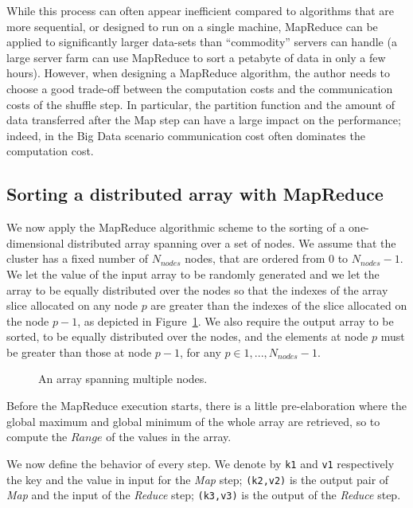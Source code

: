 \documentclass[a4paper]{article}
\numberwithin{equation}{section}
\begin{document}
While this process can often appear
inefficient compared to algorithms that are more sequential, or
designed to run on a single machine, MapReduce can be applied to
significantly larger data-sets than ``commodity'' servers can handle (a
large server farm can use MapReduce to sort a petabyte of data in only
a few hours\cite{petasort}). 
However,
 when designing a MapReduce algorithm, the author needs to choose a
good trade-off\cite{Ullman:2012:DGM:2331042.2331053} between the
computation costs and the communication costs of the shuffle
step. In particular, the partition function and the amount of data
transferred after the Map step can have a large impact on the
performance; indeed, in the Big Data scenario communication cost often
dominates the computation cost. 


\subsection{Sorting a distributed array with MapReduce}

We now apply the MapReduce algorithmic scheme to the sorting of
a one-dimensional distributed array spanning over a set of nodes. 
We assume that the cluster has a fixed number of $N_{\mathit{nodes}}$ nodes, that are
ordered from $0$ to $N_{\mathit{nodes}}-1$. We let the value of the input array to be randomly generated 
and we let the array to be equally distributed over the nodes so that
the indexes of the array slice 
allocated on any node $p$ are greater than the indexes of the slice allocated on the node $p-1$, as
depicted in Figure~\ref{fig:distributedArray}.
We also require the output array to be sorted, to be equally
distributed over the nodes, and the elements at node $p$ must be
greater than those at node $p-1$, for any $p\in 1,...,N_{\mathit{nodes}}-1$. 

 \begin{figure}[ht]
 	\centering
 	\caption{An array spanning multiple nodes.}
 	\label{fig:distributedArray}
 \end{figure}


Before the MapReduce execution starts, there is a little
pre-elaboration where the global maximum and global minimum of the
whole array are retrieved, so to compute the $\mathit{Range}$ of the
values in the array.

We now define the behavior of every step. We denote by
\verb+k1+ and \verb+v1+ respectively the key and the value in input
for the \textit{Map} step; \verb+(k2,v2)+ is the output pair of
\textit{Map} and the input of the \textit{Reduce} step;
\verb+(k3,v3)+ is the output of the \textit{Reduce} step. 
\end{document}
